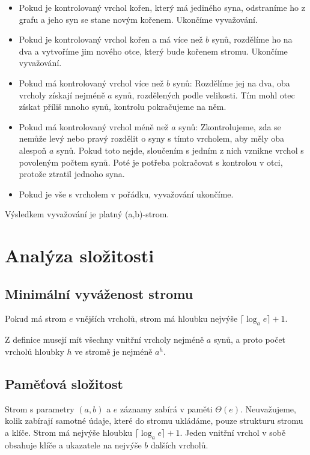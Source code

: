 \documentclass[a4paper,11pt,openany]{article}
\begin{document}
\begin{itemize}
	\item
	Pokud je kontrolovaný vrchol kořen, který má jediného syna, odstraníme ho z grafu a jeho syn se stane novým kořenem. Ukončíme vyvažování.
	\item
	Pokud je kontrolovaný vrchol kořen a má více než $b$ synů, rozdělíme ho na dva a vytvoříme jim nového otce, který bude kořenem stromu. Ukončíme vyvažování.
	\item
	Pokud má kontrolovaný vrchol více než $b$ synů: Rozdělíme jej na dva, oba vrcholy získají nejméně $a$ synů, rozdělených podle velikosti. Tím mohl otec získat příliš mnoho synů, kontrolu pokračujeme na něm.
	\item
	Pokud má kontrolovaný vrchol méně než $a$ synů: Zkontrolujeme, zda se nemůže levý nebo pravý rozdělit o syny s tímto vrcholem, aby měly oba alespoň $a$ synů. Pokud toto nejde, sloučením s jedním z nich vznikne vrchol s povoleným počtem synů. Poté je potřeba pokračovat s kontrolou v otci, protože ztratil jednoho syna.
	\item
	Pokud je vše s vrcholem v pořádku, vyvažování ukončíme.
\end{itemize}

Výsledkem vyvažování je platný (a,b)-strom.

\section{Analýza složitosti}

\subsection{Minimální vyváženost stromu}

Pokud má strom $e$ vnějších vrcholů, strom má hloubku nejvýše $\lceil\log_a e\rceil + 1$.

Z definice musejí mít všechny vnitřní vrcholy nejméně $a$ synů, a proto počet vrcholů hloubky $h$ ve stromě je nejméně $a^h$.

\subsection{Paměťová složitost}

Strom s parametry $(a,b)$ a $e$ záznamy zabírá v paměti $\Theta(e)$. Neuvažujeme, kolik zabírají samotné údaje, které do stromu ukládáme, pouze strukturu stromu a klíče. Strom má nejvýše hloubku $\lceil\log_a e\rceil + 1$. Jeden vnitřní vrchol v sobě obsahuje klíče a ukazatele na nejvýše $b$ dalších vrcholů. 
\end{document}
